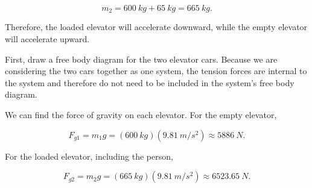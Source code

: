 \begin{mdframed}[backgroundcolor=blue!10!white]
			\begin{equation*}
				m_2 = \SI{600}{kg} + \SI{65}{kg}
				= \SI{665}{kg}.
			\end{equation*}
			
			Therefore, the loaded elevator will accelerate downward, while the empty elevator will accelerate upward.
			
			First, draw a free body diagram for the two elevator cars. Because we are considering the two cars together as one system, the tension forces are internal to the system and therefore do not need to be included in the system's free body diagram.
			
			\begin{center}
			\end{center}
			
			We can find the force of gravity on each elevator. For the empty elevator,
			
			\begin{equation*}
				F_{g1} = m_1g
				= (\SI{600}{kg})(\SI{9.81}{m/s^2})
				\approx \SI{5886}{N}.
			\end{equation*}
			
			For the loaded elevator, including the person,
			
			\begin{equation*}
				F_{g2} = m_2g
				= (\SI{665}{kg})(\SI{9.81}{m/s^2})
				\approx \SI{6523.65}{N}.
			\end{equation*}
			

\end{mdframed}
